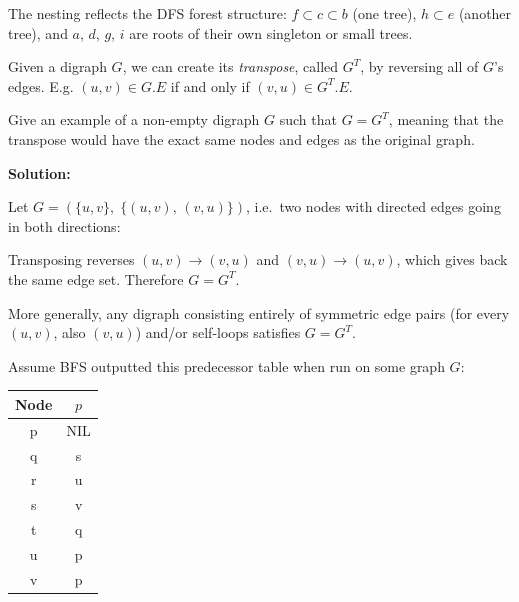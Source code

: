 \documentclass[addpoints]{exam}
\begin{document}
\begin{questions}
\begin{parts}
The nesting reflects the DFS forest structure: $f \subset c \subset b$ (one tree), $h \subset e$ (another tree), and $a$, $d$, $g$, $i$ are roots of their own singleton or small trees.

%

\end{parts}


\question[5] Given a digraph $G$, we can create its \textit{transpose}, called $G^T$, by reversing all of $G$'s edges. E.g. $(u, v) \in G.E$ if and only if $(v, u) \in G^{T}.E$.

Give an example of a non-empty digraph $G$ such that $G = G^T$, meaning that the transpose would have the exact same nodes and edges as the original graph.

\textbf{Solution:}

Let $G = (\{u, v\},\; \{(u,v),\,(v,u)\})$, i.e.\ two nodes with directed edges going in both directions:

\begin{center}
\end{center}

Transposing reverses $(u,v) \to (v,u)$ and $(v,u) \to (u,v)$, which gives back the same edge set. Therefore $G = G^T$.

More generally, any digraph consisting entirely of symmetric edge pairs (for every $(u,v)$, also $(v,u)$) and/or self-loops satisfies $G = G^T$.


\question Assume BFS outputted this predecessor table when run on some graph $G$:

\begin{tabular}{c | c}
Node & $p$ \\
\hline
p & NIL \\
q & s \\
r & u \\
s & v \\
t & q \\
u & p \\
v & p \\
\end{tabular}

\begin{parts}


\end{parts}
\end{questions}
\end{document}

